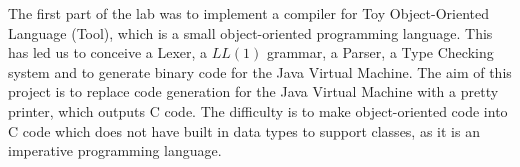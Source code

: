 The first part of the lab was to implement a compiler for Toy Object-Oriented Language (Tool),
which is a small object-oriented programming language.
\newline
This has led us to conceive a Lexer, a \(LL(1)\) grammar, a Parser, a Type Checking system and
to generate binary code for the Java Virtual Machine.
\newline
The aim of this project is to replace code generation for the Java Virtual Machine
with a pretty printer, which outputs C code.
\newline
The difficulty is to make object-oriented code into C code which does not have built in data types to support classes,
as it is an imperative programming language.
